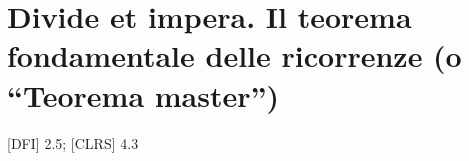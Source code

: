 \chapter{Divide et impera. Il teorema fondamentale delle ricorrenze (o ``Teorema master'')}

{{[}DFI{]} 2.5; {[}CLRS{]} 4.3}
